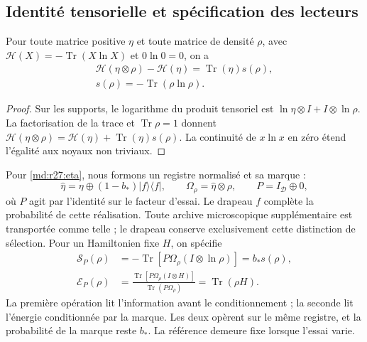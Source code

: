 \subsection{Identité tensorielle et spécification des lecteurs}
\label{md:r27:lectores}
\begin{lemma}
Pour toute matrice positive $\eta$ et toute matrice de densité $\rho$, avec $\mathscr H(X)=-\operatorname{Tr}(X\ln X)$ et $0\ln0=0$, on a
\begin{equation}
 \begin{gathered}
 \mathscr H(\eta\otimes\rho)-\mathscr H(\eta)
 =\operatorname{Tr}(\eta)s(\rho),\\
 s(\rho)=-\operatorname{Tr}(\rho\ln\rho).
 \end{gathered}
 \label{md:r27:tensor}
\end{equation}
\end{lemma}
\begin{proof}
Sur les supports, le logarithme du produit tensoriel est $\ln\eta\otimes I+I\otimes\ln\rho$. La factorisation de la trace et $\operatorname{Tr}\rho=1$ donnent $\mathscr H(\eta\otimes\rho)=\mathscr H(\eta)+\operatorname{Tr}(\eta)s(\rho)$. La continuité de $x\ln x$ en zéro étend l'égalité aux noyaux non triviaux.
\end{proof}

Pour \eqref{md:r27:eta}, nous formons un registre normalisé et sa marque :
\begin{equation}
 \widehat\eta=\eta\oplus(1-b_*)|f\rangle\langle f|,
 \qquad\Omega_\rho=\widehat\eta\otimes\rho,\qquad
 P=I_{\mathcal D}\oplus0,
 \label{md:r27:registro}
\end{equation}
où $P$ agit par l'identité sur le facteur d'essai. Le drapeau $f$ complète la probabilité de cette réalisation. Toute archive microscopique supplémentaire est transportée comme telle ; le drapeau conserve exclusivement cette distinction de sélection. Pour un Hamiltonien fixe $H$, on spécifie
\begin{equation}
 \begin{split}
 \mathcal S_P(\rho)&=-\operatorname{Tr}
 [P\Omega_\rho(I\otimes\ln\rho)]=b_*s(\rho),\\
 \mathcal E_P(\rho)&=
 \frac{\operatorname{Tr}[P\Omega_\rho(I\otimes H)]}
 {\operatorname{Tr}(P\Omega_\rho)}=\operatorname{Tr}(\rho H).
 \end{split}
 \label{md:r27:par-lector}
\end{equation}
La première opération lit l'information avant le conditionnement ; la seconde lit l'énergie conditionnée par la marque. Les deux opèrent sur le même registre, et la probabilité de la marque reste $b_*$. La référence demeure fixe lorsque l'essai varie.

